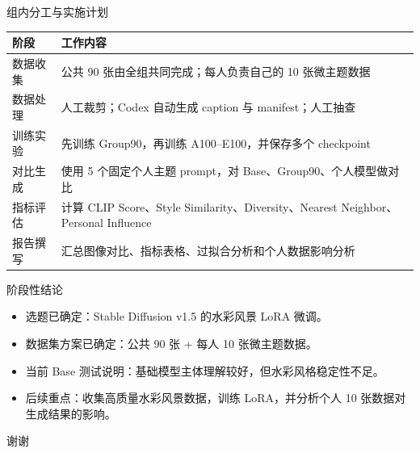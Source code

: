 \documentclass[aspectratio=169,11pt]{ctexbeamer}
\begin{document}
\begin{frame}{组内分工与实施计划}
  \small
  \begin{tabularx}{\textwidth}{l X}
    \toprule
    阶段 & 工作内容 \\
    \midrule
    数据收集 & 公共 90 张由全组共同完成；每人负责自己的 10 张微主题数据 \\
    数据处理 & 人工裁剪；Codex 自动生成 caption 与 manifest；人工抽查 \\
    训练实验 & 先训练 Group90，再训练 A100--E100，并保存多个 checkpoint \\
    对比生成 & 使用 5 个固定个人主题 prompt，对 Base、Group90、个人模型做对比 \\
    指标评估 & 计算 CLIP Score、Style Similarity、Diversity、Nearest Neighbor、Personal Influence \\
    报告撰写 & 汇总图像对比、指标表格、过拟合分析和个人数据影响分析 \\
    \bottomrule
  \end{tabularx}
\end{frame}

\begin{frame}{阶段性结论}
  \begin{itemize}
    \item 选题已确定：Stable Diffusion v1.5 的水彩风景 LoRA 微调。
    \item 数据集方案已确定：公共 90 张 + 每人 10 张微主题数据。
    \item 当前 Base 测试说明：基础模型主体理解较好，但水彩风格稳定性不足。
    \item 后续重点：收集高质量水彩风景数据，训练 LoRA，并分析个人 10 张数据对生成结果的影响。
  \end{itemize}

  \vfill
  \centering
  \Large 谢谢
\end{frame}
\end{document}
